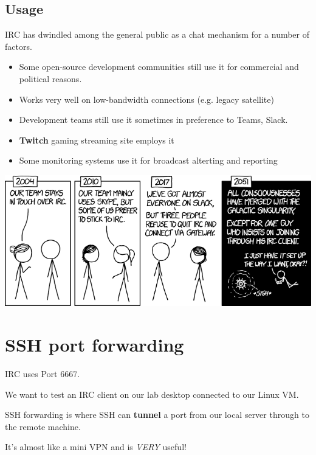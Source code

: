 \documentclass[slides]{pgnotes}
\begin{document}
\subsection{Usage}

IRC has dwindled among the general public as a chat mechanism for a number of factors.

\begin{itemize}
\item Some open-source development communities still use it for commercial and political reasons.
\item Works very well on low-bandwidth connections (e.g. legacy satellite)
\item Development teams still use it sometimes in preference to Teams, Slack.
\item \textbf{Twitch} gaming streaming site employs it
\item Some monitoring systems use it for broadcast alterting and reporting
\end{itemize}

\newpage

\includegraphics[width=1.0\linewidth]{xkcd_irc}


\section{SSH port forwarding}

IRC uses Port 6667.

We want to test an IRC client on our lab desktop connected to our Linux VM.

SSH forwarding is where SSH can \textbf{tunnel} a port from our local server through to the remote machine.

It's almost like a mini VPN and is \textit{VERY} useful!
\end{document}
